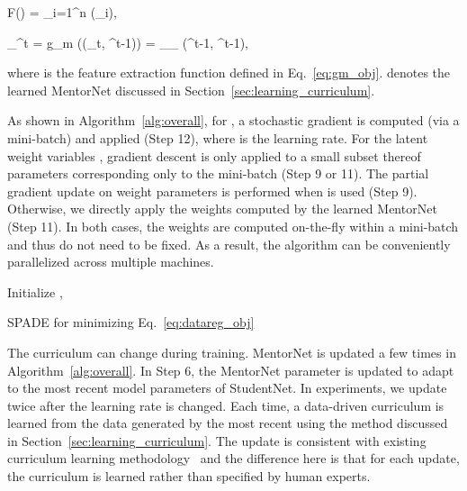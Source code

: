 \documentclass{article}
\begin{document}
F() =  \sum_{i=1}^n \rho(\ell_i),
\vspace{-3mm}

_{\Xi}^{t} \!=\! g_m (\phi(\Xi_t, ^{t-1})) \!=\! \arg\min_{_{\Xi}}  (^{t-1},\! ^{t-1}),
\vspace{-1mm}

where  is the feature extraction function defined in Eq.~\eqref{eq:gm_obj}.  denotes the learned MentorNet discussed in Section~\ref{sec:learning_curriculum}.

As shown in Algorithm~\ref{alg:overall}, for , a stochastic gradient is computed (via a mini-batch) and applied (Step 12), where  is the learning rate. For the latent weight variables , gradient descent is only applied to a small subset thereof parameters corresponding only to the mini-batch (Step 9 or 11). The partial gradient update on weight parameters is performed when  is used (Step 9). Otherwise, we directly apply the weights computed by the learned MentorNet (Step 11). In both cases, the weights are computed on-the-fly within a mini-batch and thus do not need to be fixed. As a result, the algorithm can be conveniently parallelized across multiple machines.

{
\vspace{-2mm}
\begin{algorithm}[ht]
\footnotesize
{}
\LinesNumbered
{}
Initialize , \;

\Return 
\caption{{\small SPADE for minimizing Eq.~\eqref{eq:datareg_obj}}}
\label{alg:overall}
\end{algorithm}
\vspace{-2mm}
}



The curriculum can change during training. MentorNet is updated a few times in Algorithm~\ref{alg:overall}. In Step 6, the MentorNet parameter  is updated to adapt to the most recent model parameters of StudentNet. In experiments, we update  twice after the learning rate is changed. Each time, a data-driven curriculum is learned from the data generated by the most recent  using the method discussed in Section~\ref{sec:learning_curriculum}. The update is consistent with existing curriculum learning methodology~\cite{bengio2009curriculum,kumar2010self} and the difference here is that for each update, the curriculum is learned rather than specified by human experts.
\end{document}
